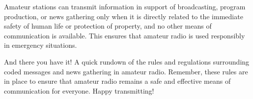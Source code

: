 Amateur stations can transmit information in support of broadcasting, program production, or news gathering only when it is directly related to the immediate safety of human life or protection of property, and no other means of communication is available. This ensures that amateur radio is used responsibly in emergency situations.

And there you have it! A quick rundown of the rules and regulations surrounding coded messages and news gathering in amateur radio. Remember, these rules are in place to ensure that amateur radio remains a safe and effective means of communication for everyone. Happy transmitting!

